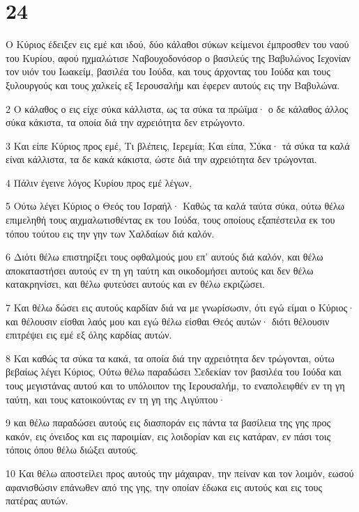 \chapter{24}

\par Ο Κύριος έδειξεν εις εμέ και ιδού, δύο κάλαθοι σύκων κείμενοι έμπροσθεν του ναού του Κυρίου, αφού ηχμαλώτισε Ναβουχοδονόσορ ο βασιλεύς της Βαβυλώνος Ιεχονίαν τον υιόν του Ιωακείμ, βασιλέα του Ιούδα, και τους άρχοντας του Ιούδα και τους ξυλουργούς και τους χαλκείς εξ Ιερουσαλήμ και έφερεν αυτούς εις την Βαβυλώνα.
\par 2 Ο κάλαθος ο εις είχε σύκα κάλλιστα, ως τα σύκα τα πρώϊμα· ο δε κάλαθος άλλος σύκα κάκιστα, τα οποία διά την αχρειότητα δεν ετρώγοντο.
\par 3 Και είπε Κύριος προς εμέ, Τι βλέπεις, Ιερεμία; Και είπα, Σύκα· τά σύκα τα καλά είναι κάλλιστα, τα δε κακά κάκιστα, ώστε διά την αχρειότητα δεν τρώγονται.
\par 4 Πάλιν έγεινε λόγος Κυρίου προς εμέ λέγων,
\par 5 Ούτω λέγει Κύριος ο Θεός του Ισραήλ· Καθώς τα καλά ταύτα σύκα, ούτω θέλω επιμεληθή τους αιχμαλωτισθέντας εκ του Ιούδα, τους οποίους εξαπέστειλα εκ του τόπου τούτου εις την γην των Χαλδαίων διά καλόν.
\par 6 Διότι θέλω επιστηρίξει τους οφθαλμούς μου επ' αυτούς διά καλόν, και θέλω αποκαταστήσει αυτούς εν τη γη ταύτη και οικοδομήσει αυτούς και δεν θέλω κατακρηνίσει, και θέλω φυτεύσει αυτούς και εν θέλω εκριζώσει.
\par 7 Και θέλω δώσει εις αυτούς καρδίαν διά να με γνωρίσωσιν, ότι εγώ είμαι ο Κύριος· και θέλουσιν είσθαι λαός μου και εγώ θέλω είσθαι Θεός αυτών· διότι θέλουσιν επιτρέψει εις εμέ εξ όλης καρδίας αυτών.
\par 8 Και καθώς τα σύκα τα κακά, τα οποία διά την αχρειότητα δεν τρώγονται, ούτω βεβαίως λέγει Κύριος, Ούτω θέλω παραδώσει Σεδεκίαν τον βασιλέα του Ιούδα και τους μεγιστάνας αυτού και το υπόλοιπον της Ιερουσαλήμ, το εναπολειφθέν εν τη γη ταύτη, και τους κατοικούντας εν τη γη της Αιγύπτου·
\par 9 και θέλω παραδώσει αυτούς εις διασποράν εις πάντα τα βασίλεια της γης προς κακόν, εις όνειδος και εις παροιμίαν, εις λοιδορίαν και εις κατάραν, εν πάσι τοις τόποις όπου θέλω διώξει αυτούς.
\par 10 Και θέλω αποστείλει προς αυτούς την μάχαιραν, την πείναν και τον λοιμόν, εωσού αφανισθώσιν επάνωθεν από της γης, την οποίαν έδωκα εις αυτούς και εις τους πατέρας αυτών.

